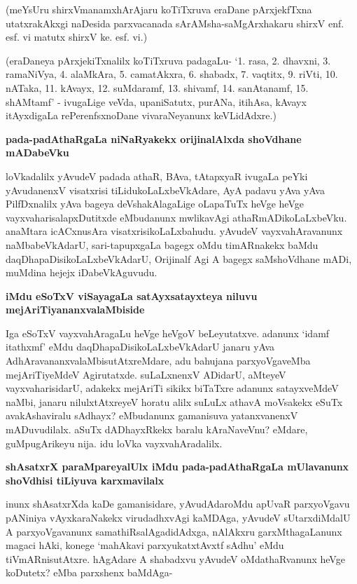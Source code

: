 \noindent
(meYsUru shirxVmanamxhArAjaru koTiTxruva eraDane pArxjekfTxna utatxrakAkxgi naDesida parxvacanada sArAMsha-saMgArxhakaru shirxV enf. esf. vi matutx shirxV ke. esf. vi.)

(eraDaneya pArxjekiTxnalilx koTiTxruva padagaLu- `1. rasa, 2. dhavxni, 3. ramaNiVya, 4. alaMkAra, 5. camatAkxra, 6. shabadx, 7. vaqtitx, 9. riVti, 10. nATaka, 11. kAvayx, 12. suMdaramf, 13. shivamf, 14. sanAtanamf, 15. shAMtamf' - ivugaLige veVda, upaniSatutx, purANa, itihAsa, kAvayx itAyxdigaLa rePerenfsxnoDane vivaraNeyanunx keVLidAdxre.)

{\bigskip
\noindent
{\large\bf pada-padAthaRgaLa niNaRyakekx orijinalAlxda shoVdhane mADabeVku}}\label{page215}
\medskip

\noindent
loVkadalilx yAvudeV padada athaR, BAva, tAtapxyaR ivugaLa peYki yAvudanenxV visatxrisi tiLidukoLaLxbeVkAdare, AyA padavu yAva yAva PilfDxnalilx yAva bageya deVshakAlagaLige oLapaTuTx heVge heVge vayxvaharisalapxDutitxde eMbudanunx mwlikavAgi athaRmADikoLaLxbeVku. anaMtara icACxnusAra visatxrisikoLaLxbahudu. yAvudeV vayxvahAravanunx naMbabeVkAdarU, sari-tapupxgaLa bagegx oMdu timARnakekx baMdu daqDhapaDisikoLaLxbeVkAdarU, Orijinalf Agi A bagegx saMshoVdhane mADi, muMdina hejejx iDabeVkAguvudu.

{\bigskip
\noindent
{\large\bf iMdu eSoTxV viSayagaLa satAyxsatayxteya niluvu mejAriTiyananxvalaMbiside}}\label{page215a}
\medskip

\noindent
Iga eSoTxV vayxvahAragaLu heVge heVgoV beLeyutatxve. adanunx `idamf itathxmf' eMdu daqDhapaDisikoLaLxbeVkAdarU janaru yAva AdhAravananxvalaMbisutAtxreMdare, adu bahujana parxyoVgaveMba mejAriTiyeMdeV Agirutatxde. suLaLxnenxV ADidarU, aMteyeV vayxvaharisidarU, adakekx mejAriTi sikikx biTaTxre adanunx satayxveMdeV naMbi, janaru nilulxtAtxreyeV horatu alilx suLuLx athavA moVsakekx eSuTx avakAshaviralu sAdhayx? eMbudanunx gamanisuva yatanxvanenxV mADuvudilalx. aSuTx dADhayxRkekx baralu kAraNaveVnu? eMdare, guMpugArikeyu nija. idu loVka vayxvahAradalilx.

{\bigskip
\noindent
{\large\bf shAsatxrX paraMpareyalUlx iMdu pada-padAthaRgaLa mUlavanunx shoVdhisi tiLiyuva karxmavilalx}}\label{page216}
\medskip

\noindent
inunx shAsatxrXda kaDe gamanisidare, yAvudAdaroMdu apUvaR parxyoVgavu pANiniya vAyxkaraNakekx virudadhxvAgi kaMDAga, yAvudeV sUtarxdiMdalU A parxyoVgavanunx samathiRsalAgadidAdxga, nAlAkxru garxMthagaLanunx magaci hAki, konege `mahAkavi parxyukatxtAvxtf sAdhu'\label{216} eMdu tiVmARnisutAtxre. hAgAdare A shabadxvu yAvudeV oMdathaRvanunx heVge koDutetx? eMba parxshenx baMdAga-

